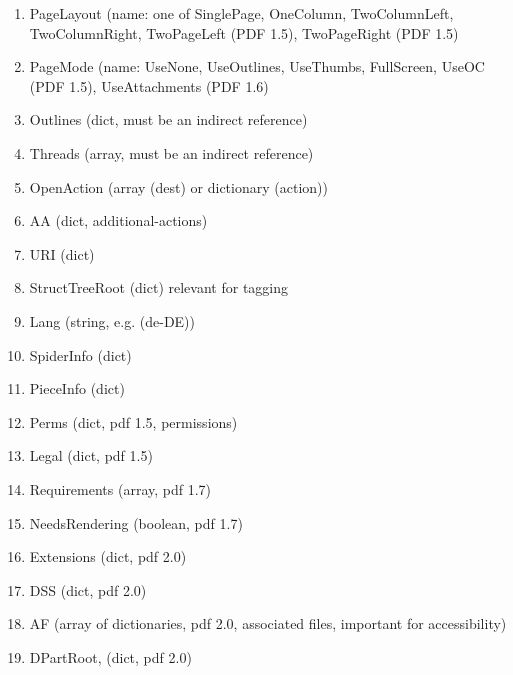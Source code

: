\documentclass{article}
\begin{document}
\begin{itemize}
\begin{enumerate}
  \item PageLayout (name: one of SinglePage, OneColumn,
  TwoColumnLeft, TwoColumnRight, TwoPageLeft (PDF 1.5), TwoPageRight (PDF 1.5)
  \item PageMode (name: UseNone, UseOutlines, UseThumbs, FullScreen, UseOC (PDF 1.5),
   UseAttachments (PDF 1.6)

  \item Outlines (dict, must be an indirect reference)
  \item Threads (array, must be an indirect reference)
  \item OpenAction (array (dest) or dictionary (action))
  \item AA (dict, additional-actions)
  \item URI (dict)
  \item StructTreeRoot (dict) relevant for tagging

   \item Lang (string, e.g. (de-DE))
  \item SpiderInfo (dict)
  \item PieceInfo (dict)

  \item Perms (dict, pdf 1.5, permissions)
  \item Legal (dict, pdf 1.5)
  \item Requirements (array, pdf 1.7)

  \item NeedsRendering (boolean, pdf 1.7)
  \item Extensions (dict, pdf 2.0)
  \item DSS (dict, pdf 2.0)
  \item AF (array of dictionaries, pdf 2.0, associated files, important for accessibility)
  \item DPartRoot, (dict, pdf 2.0)
\end{enumerate}
\end{itemize}
\end{document}
